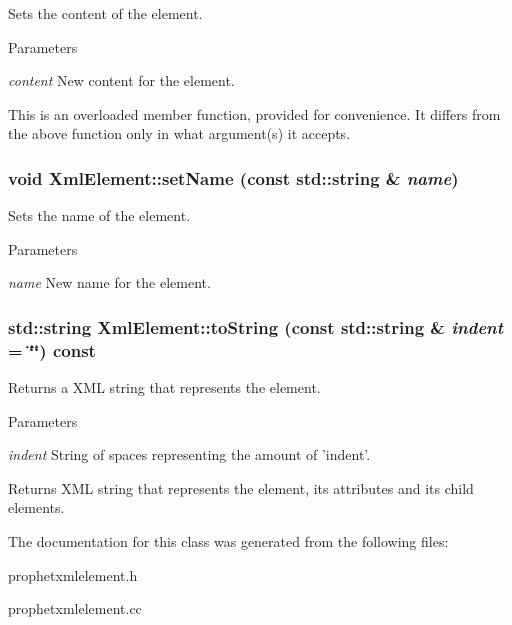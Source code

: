 Sets the content of the element. 


\begin{DoxyParams}{Parameters}
\item[{\em content}]New content for the element.\end{DoxyParams}
This is an overloaded member function, provided for convenience. It differs from the above function only in what argument(s) it accepts. \hypertarget{classXmlElement_a0ed6ad08fd972865cca13ae2594fedda}{
\subsubsection[{setName}]{\setlength{\rightskip}{0pt plus 5cm}void XmlElement::setName (const std::string \& {\em name})}}
\label{classXmlElement_a0ed6ad08fd972865cca13ae2594fedda}


Sets the name of the element. 


\begin{DoxyParams}{Parameters}
\item[{\em name}]New name for the element. \end{DoxyParams}
\hypertarget{classXmlElement_a2e783a5fed6b5b31b2d11117e6c83d40}{
\subsubsection[{toString}]{\setlength{\rightskip}{0pt plus 5cm}std::string XmlElement::toString (const std::string \& {\em indent} = {\ttfamily \char`\"{}\char`\"{}}) const}}
\label{classXmlElement_a2e783a5fed6b5b31b2d11117e6c83d40}


Returns a XML string that represents the element. 


\begin{DoxyParams}{Parameters}
\item[{\em indent}]String of spaces representing the amount of 'indent'. \end{DoxyParams}
\begin{DoxyReturn}{Returns}
XML string that represents the element, its attributes and its child elements. 
\end{DoxyReturn}


The documentation for this class was generated from the following files:\begin{DoxyCompactItemize}
\item 
prophetxmlelement.h\item 
prophetxmlelement.cc\end{DoxyCompactItemize}
